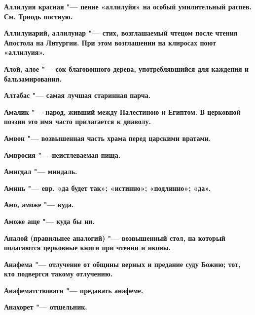 \begin{mymulticols}{2}
\bfseries Аллилуия красная\normalfont{} "--- пение «аллилуйя» на особый умилительный распев. См. Триодь постную. 




\bfseries Аллилуиарий, аллилуиар\normalfont{} "--- стих, возглашаемый чтецом после чтения Апостола на Литургии. При этом возглашении на клиросах поют «аллилуия». 




\bfseries Алой, алое\normalfont{} "--- сок благовонного дерева, употреблявшийся для каждения и бальзамирования. 




\bfseries Алтабас\normalfont{} "--- самая лучшая старинная парча. 




\bfseries Амалик\normalfont{} "--- народ, живший между Палестиною и Египтом. В церковной поэзии это имя часто прилагается к диаволу. 




\bfseries Амвон\normalfont{} "--- возвышенная часть храма перед царскими вратами. 




\bfseries Амвросия\normalfont{} "--- неистлеваемая пища. 




\bfseries Амигдал\normalfont{} "--- миндаль. 




\bfseries Аминь\normalfont{} "--- евр. «да будет так»; «истинно»; «подлинно»; «да». 




\bfseries Амо, аможе\normalfont{} "--- куда. 




\bfseries Аможе аще\normalfont{} "--- куда бы ни. 




\bfseries Аналой\normalfont{} (правильнее \bfseries аналогий\normalfont{}) "--- возвышенный стол, на который полагаются церковные книги при чтении и иконы. 




\bfseries Анафема\normalfont{} "--- отлучение от общины верных и предание суду Божию; тот, кто подвергся такому отлучению. 




\bfseries Анафематствовати\normalfont{} "--- предавать анафеме. 




\bfseries Анахорет\normalfont{} "--- отшельник. 





\end{mymulticols}

